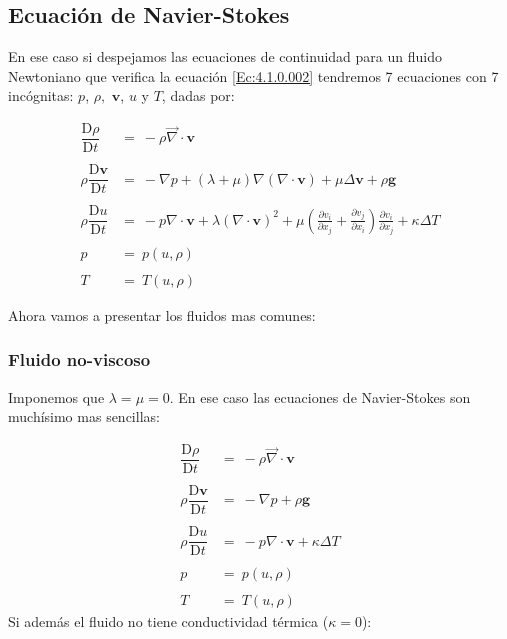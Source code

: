 \documentclass[12pt,a4paper]{article}
\numberwithin{equation}{section}
\numberwithin{figure}{section}
\newcommand{\parentesis}[1]{\left( #1  \right)}
\newcommand{\parciales}[2]{\frac{\partial #1}{\partial #2}}
\newcommand{\Dd}{\mathrm{D}}
\newcommand{\vn}{\mathbf{v}}
\newcommand{\gn}{\mathbf{g}}
\begin{document}
\subsection{Ecuación de Navier-Stokes}

En ese caso si despejamos las ecuaciones de continuidad para un fluido Newtoniano que verifica la ecuación \ref{Ec:4.1.0.002} tendremos 7 ecuaciones con 7 incógnitas: $p$, $\rho,$ $\vn$, $u$ y $T$, dadas por:

\begin{equation}
\begin{array}{rl}
\dfrac{\Dd \rho}{\Dd t} & =  \ - \rho \vec{\nabla} \cdot \vn \\ \\
\rho \dfrac{\Dd \vn}{\Dd t}  & = \  - \nabla p + (\lambda+ \mu) \nabla (\nabla \cdot \vn) + \mu \Delta \vn + \rho \gn \\ \\
\rho \dfrac{\Dd u}{\Dd t} &  = \ - p \nabla \cdot \vn + \lambda ( \nabla \cdot \vn)^2  + \mu \parentesis{\parciales{v_i}{x_j} + \parciales{v_j}{x_i}} \parciales{v_i}{x_j} + \kappa \Delta T \\ \\
p  & = \  p(u,\rho) \\ \\
T & =  \ T(u,\rho) 
\end{array}
\end{equation}

Ahora vamos a presentar los fluidos mas comunes:


\subsubsection{Fluido no-viscoso}

Imponemos que $\lambda = \mu = 0$. En ese caso las ecuaciones de Navier-Stokes son muchísimo mas sencillas:

\begin{equation}
\begin{array}{rl}
\dfrac{\Dd \rho}{\Dd t} & =  \ - \rho \vec{\nabla} \cdot \vn \\ \\
\rho \dfrac{\Dd \vn}{\Dd t}  & = \  - \nabla p + \rho \gn \\ \\
\rho \dfrac{\Dd u}{\Dd t} &  = \ - p \nabla \cdot \vn + \kappa \Delta T \\ \\
p  & = \  p(u,\rho) \\ \\
T & =  \ T(u,\rho) 
\end{array}
\end{equation}
Si además el fluido no tiene conductividad térmica ($\kappa = 0$):
\end{document}
